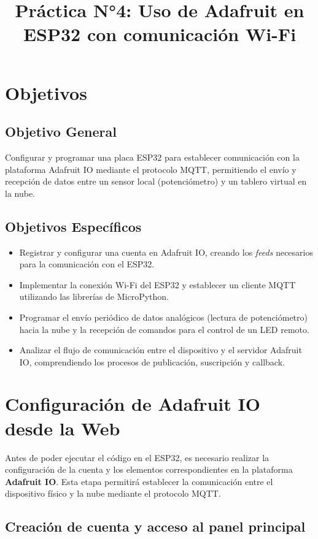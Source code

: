 \documentclass[a4paper,12pt]{article}
\title{Práctica N°4: Uso de Adafruit en ESP32 con comunicación Wi-Fi}
\date{}
\begin{document}
\maketitle
\tableofcontents
\newpage

\section{Objetivos}

\subsection{Objetivo General}
Configurar y programar una placa ESP32 para establecer comunicación con la plataforma Adafruit IO mediante el protocolo MQTT, permitiendo el envío y recepción de datos entre un sensor local (potenciómetro) y un tablero virtual en la nube.

\subsection{Objetivos Específicos}
\begin{itemize}
    \item Registrar y configurar una cuenta en Adafruit IO, creando los \textit{feeds} necesarios para la comunicación con el ESP32.
    \item Implementar la conexión Wi-Fi del ESP32 y establecer un cliente MQTT utilizando las librerías de MicroPython.
    \item Programar el envío periódico de datos analógicos (lectura de potenciómetro) hacia la nube y la recepción de comandos para el control de un LED remoto.
    \item Analizar el flujo de comunicación entre el dispositivo y el servidor Adafruit IO, comprendiendo los procesos de publicación, suscripción y callback.
\end{itemize}

\section{Configuración de Adafruit IO desde la Web}

Antes de poder ejecutar el código en el ESP32, es necesario realizar la configuración de la cuenta y los elementos correspondientes en la plataforma \textbf{Adafruit IO}. Esta etapa permitirá establecer la comunicación entre el dispositivo físico y la nube mediante el protocolo MQTT.

\subsection{Creación de cuenta y acceso al panel principal}
\end{document}
